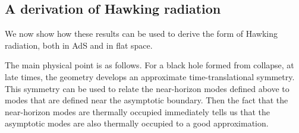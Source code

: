 \documentclass[12pt]{article}
\begin{document}
\subsection{A derivation of Hawking radiation \label{hawkingderiv}}
We now show how these results can be used to derive the form of Hawking radiation, both in AdS and in flat space. 

The main physical point is as follows.  For a black hole formed from collapse, at late times, the geometry develops an approximate time-translational symmetry. This symmetry can be used to relate the near-horizon modes defined above to modes that are defined near the asymptotic boundary.  Then the fact that the near-horizon modes are thermally occupied immediately tells us that the asymptotic modes are also thermally occupied to a good approximation.
\end{document}
